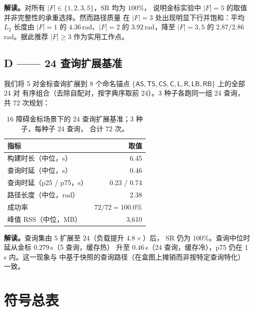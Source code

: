 \documentclass[journal]{IEEEtran}
\begin{document}
\noindent\textbf{解读。}对所有 $|F|\in\{1,2,3,5\}$，SR 均为 $100\%$，
说明金标实验中 $|F|{=}5$ 的取值并非完整性的承重选择。然而路径质量
在 $|F|{=}3$ 处出现明显下行并饱和：平均 $L_2$ 长度由 $|F|{=}1$ 的
$4.36$\,rad、$|F|{=}2$ 的 $3.92$\,rad，降至 $|F|{=}3,5$ 的
$2.87/2.86$\,rad。据此推荐 $|F|\geq 3$ 作为实用工作点。

\subsection{D —— 24 查询扩展基准}\label{app:d_query}

我们将 5 对金标查询扩展到 8 个命名锚点
$\{\textsf{AS}, \textsf{TS}, \textsf{CS}, \textsf{C},
\textsf{L}, \textsf{R}, \textsf{LB}, \textsf{RB}\}$ 上的全部 24 对
有序组合（去除自配对，按字典序取前 24）。3 种子各跑同一组 24 查询，
共 $72$ 次规划：

\begin{table}[ht]
\centering
\small
\caption{16 障碍金标场景下的 24 查询扩展基准；3 种子，每种子 24 查询，
合计 $72$ 次。}
\label{tab:query_bench_supp_zh}
\begin{tabular}{@{}lr@{}}
\toprule
指标 & 取值 \\
\midrule
构建时长（中位，s）          & 6.45 \\
查询时延（中位，s）          & 0.46 \\
查询时延（p25 / p75，s）     & 0.23 / 0.74 \\
路径长度（中位，rad）        & 2.38 \\
成功率                       & $72/72 = 100.0\%$ \\
峰值 RSS（中位，MB）         & 3{,}610 \\
\bottomrule
\end{tabular}
\end{table}

\noindent\textbf{解读。}查询集由 $5$ 扩展至 $24$（负载提升 $4.8\times$）后，
SR 仍为 $100\%$。查询中位时延从金标 $0.279$\,s（5 查询，缓存热）
升至 $0.46$\,s（24 查询，缓存冷），p75 仍在 1\,s 内。这一现象与
 中基于快照的查询路径（在盒图上摊销而非按特定查询特化）
一致。

\section{符号总表}\label{app:notation}
\end{document}

